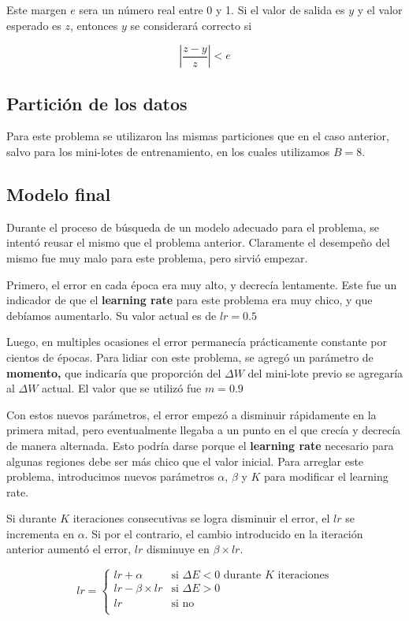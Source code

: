 \documentclass[a4paper,10pt]{article}
\begin{document}
Este margen $e$ sera un número real entre 0 y 1. Si el valor de salida es $y$
y el valor esperado es $z$, entonces $y$ se considerará correcto si

\[ \left|\frac{z - y}{z}\right| < e \]

\subsection{Partición de los datos}

Para este problema se utilizaron las mismas particiones que en el caso
anterior, salvo para los mini-lotes de entrenamiento, en los cuales utilizamos
$B=8$.

\subsection{Modelo final}

Durante el proceso de búsqueda de un modelo adecuado para el problema, se
intentó reusar el mismo que el problema anterior. Claramente el desempeño del
mismo fue muy malo para este problema, pero sirvió empezar.

Primero, el error en cada época era muy alto, y decrecía lentamente. Este fue
un indicador de que el \textbf{learning rate} para este problema era muy
chico, y que debíamos aumentarlo. Su valor actual es de $lr=0.5$

Luego, en multiples ocasiones el error permanecía prácticamente constante por
cientos de épocas. Para lidiar con este problema, se agregó un parámetro de
\textbf{momento,} que indicaría que proporción del $\Delta{}W$ del mini-lote
previo se agregaría al $\Delta{}W$ actual. El valor que se utilizó fue $m=0.9$

Con estos nuevos parámetros, el error empezó a disminuir rápidamente en la
primera mitad, pero eventualmente llegaba a un punto en el que crecía y
decrecía de manera alternada. Esto podría darse porque el \textbf{learning
rate} necesario para algunas regiones debe ser más chico que el valor inicial.
Para arreglar este problema, introducimos nuevos parámetros $\alpha$, $\beta$
y $K$ para modificar el learning rate.

Si durante $K$ iteraciones consecutivas se logra disminuir el error, el $lr$
se incrementa en $\alpha$. Si por el contrario, el cambio introducido en la
iteración anterior aumentó el error, $lr$ disminuye en $\beta \times lr$.

\[
	lr = \begin{cases}
		lr + \alpha & \text{si $\Delta E < 0$ durante $K$ iteraciones} \\
		lr - \beta \times lr & \text{si $\Delta E > 0$} \\
		lr & \text{si no} \\
	\end{cases}
\]
\end{document}
